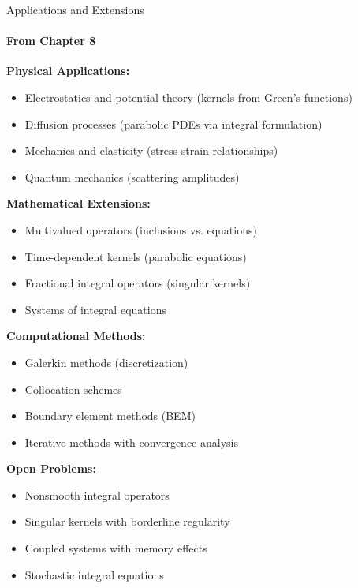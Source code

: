 \documentclass[aspectratio=169,10pt]{beamer}
\theoremstyle{plain}
\theoremstyle{definition}
\begin{document}
\begin{frame}[allowframebreaks]{Applications and Extensions}
  \framesubtitle{From Chapter 8}

  \vspace{0.3cm}
  \textbf{Physical Applications:}
  \begin{itemize}
    \item Electrostatics and potential theory (kernels from Green's functions)
    \item Diffusion processes (parabolic PDEs via integral formulation)
    \item Mechanics and elasticity (stress-strain relationships)
    \item Quantum mechanics (scattering amplitudes)
  \end{itemize}

  \vspace{0.2cm}
  \textbf{Mathematical Extensions:}
  \begin{itemize}
    \item Multivalued operators (inclusions vs. equations)
    \item Time-dependent kernels (parabolic equations)
    \item Fractional integral operators (singular kernels)
    \item Systems of integral equations
  \end{itemize}

  \vspace{0.2cm}
  \textbf{Computational Methods:}
  \begin{itemize}
    \item Galerkin methods (discretization)
    \item Collocation schemes
    \item Boundary element methods (BEM)
    \item Iterative methods with convergence analysis
  \end{itemize}

  \vspace{0.2cm}
  \textbf{Open Problems:}
  \begin{itemize}
    \item Nonsmooth integral operators
    \item Singular kernels with borderline regularity
    \item Coupled systems with memory effects
    \item Stochastic integral equations
  \end{itemize}
\end{frame}
\end{document}

